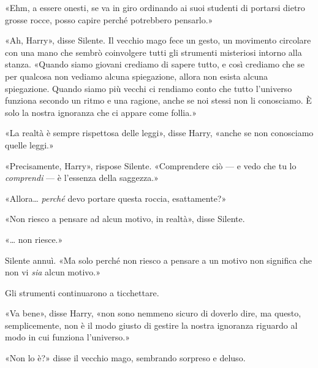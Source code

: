«Ehm, a essere onesti, se va in giro ordinando ai suoi studenti di portarsi dietro grosse rocce, posso capire perché potrebbero pensarlo.»

«Ah, Harry», disse Silente. Il vecchio mago fece un gesto, un movimento circolare con una mano che sembrò coinvolgere tutti gli strumenti misteriosi intorno alla stanza. «Quando siamo giovani crediamo di sapere tutto, e così crediamo che se per qualcosa non vediamo alcuna spiegazione, allora non esista alcuna spiegazione. Quando siamo più vecchi ci rendiamo conto che tutto l’universo funziona secondo un ritmo e una ragione, anche se noi stessi non li conosciamo. È solo la nostra ignoranza che ci appare come follia.»

«La realtà è sempre rispettosa delle leggi», disse Harry, «anche se non conosciamo quelle leggi.»

«Precisamente, Harry», rispose Silente. «Comprendere ciò — e vedo che tu lo \textit{comprendi} — è l’essenza della saggezza.»

«Allora… \textit{perché} devo portare questa roccia, esattamente?»

«Non riesco a pensare ad alcun motivo, in realtà», disse Silente.

«… non riesce.»

Silente annuì. «Ma solo perché non riesco a pensare a un motivo non significa che non vi \textit{sia} alcun motivo.»

Gli strumenti continuarono a ticchettare.

«Va bene», disse Harry, «non sono nemmeno sicuro di doverlo dire, ma questo, semplicemente, non è il modo giusto di gestire la nostra ignoranza riguardo al modo in cui funziona l’universo.»

«Non lo è?» disse il vecchio mago, sembrando sorpreso e deluso.

